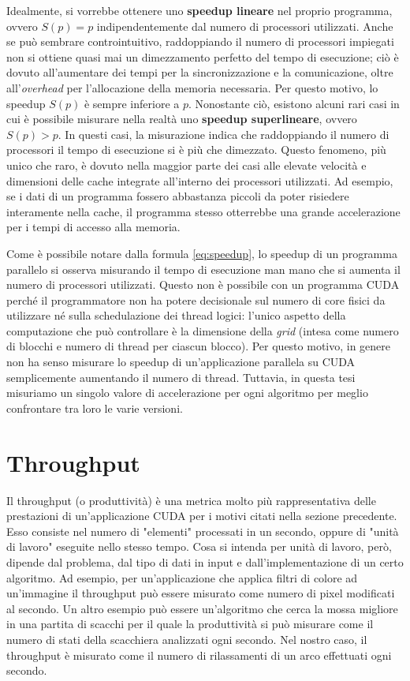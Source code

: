 \documentclass[12pt,a4paper,oneside]{book}
\begin{document}
	Idealmente, si vorrebbe ottenere uno \textbf{speedup lineare} nel proprio programma, ovvero $S(p) = p$ indipendentemente dal numero di processori utilizzati. Anche se può sembrare controintuitivo, raddoppiando il numero di processori impiegati non si ottiene quasi mai un dimezzamento perfetto del tempo di esecuzione; ciò è dovuto all'aumentare dei tempi per la sincronizzazione e la comunicazione, oltre all'\textit{overhead} per l'allocazione della memoria necessaria. Per questo motivo, lo speedup $S(p)$ è sempre inferiore a $p$. Nonostante ciò, esistono alcuni rari casi in cui è possibile misurare nella realtà uno \textbf{speedup superlineare}, ovvero $S(p) > p$. In questi casi, la misurazione indica che raddoppiando il numero di processori il tempo di esecuzione si è più che dimezzato. Questo fenomeno, più unico che raro, è dovuto nella maggior parte dei casi alle elevate velocità e dimensioni delle cache integrate all'interno dei processori utilizzati. Ad esempio, se i dati di un programma fossero abbastanza piccoli da poter risiedere interamente nella cache, il programma stesso otterrebbe una grande accelerazione per i tempi di accesso alla memoria.
	
	Come è possibile notare dalla formula \ref{eq:speedup}, lo speedup di un programma parallelo si osserva misurando il tempo di esecuzione man mano che si aumenta il numero di processori utilizzati. Questo non è possibile con un programma CUDA perché il programmatore non ha potere decisionale sul numero di core fisici da utilizzare né sulla schedulazione dei thread logici: l'unico aspetto della computazione che può controllare è la dimensione della \textit{grid} (intesa come numero di blocchi e numero di thread per ciascun blocco). Per questo motivo, in genere non ha senso misurare lo speedup di un'applicazione parallela su CUDA semplicemente aumentando il numero di thread. Tuttavia, in questa tesi misuriamo un singolo valore di accelerazione per ogni algoritmo per meglio confrontare tra loro le varie versioni.
	
	\section{Throughput}
	Il throughput (o produttività) è una metrica molto più rappresentativa delle prestazioni di un'applicazione CUDA per i motivi citati nella sezione precedente. Esso consiste nel numero di "elementi" processati in un secondo, oppure di "unità di lavoro" eseguite nello stesso tempo. Cosa si intenda per unità di lavoro, però, dipende dal problema, dal tipo di dati in input e dall'implementazione di un certo algoritmo. Ad esempio, per un'applicazione che applica filtri di colore ad un'immagine il throughput può essere misurato come numero di pixel modificati al secondo. Un altro esempio può essere un'algoritmo che cerca la mossa migliore in una partita di scacchi per il quale la produttività si può misurare come il numero di stati della scacchiera analizzati ogni secondo. Nel nostro caso, il throughput è misurato come il numero di rilassamenti di un arco effettuati ogni secondo.
	
\end{document}
